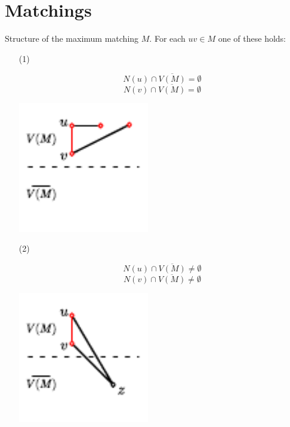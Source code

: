 \documentclass[notitlepage, 12pt]{article}
\begin{document}
\section{Matchings}
Structure of the maximum matching $M$. For each $uv \in M$ one of these holds:
\begin{itemize}
\item[(1)] 
\begin{minipage}{.5\textwidth}
  \[
    N(u) \cap \overline{V(M)} = \emptyset
  \]
  \[
    N(v) \cap \overline{V(M)} = \emptyset
  \]
\end{minipage}%
\begin{minipage}{.5\textwidth}
  \includegraphics[width=0.45\textwidth]{max-matching-structure-1.pdf}
  \centering
\end{minipage}

\item[(2)] 
\begin{minipage}{.5\textwidth}
  \[
    N(u) \cap \overline{V(M)} \neq \emptyset
  \]
  \[
    N(v) \cap \overline{V(M)} \neq \emptyset
  \]
\end{minipage}%
\begin{minipage}{.5\textwidth}
  \includegraphics[width=0.45\textwidth]{max-matching-structure-2.pdf}
  \centering
\end{minipage}


\end{itemize}
\end{document}
